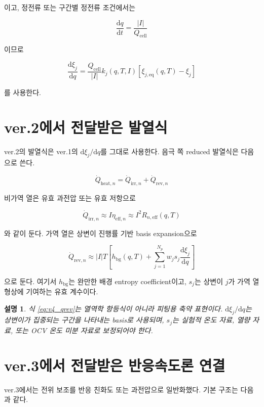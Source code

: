 \documentclass[11pt,a4paper]{article}
\newtheorem*{note}{설명}
\newcommand{\dd}{\mathrm{d}}
\newcommand{\eff}{\mathrm{eff}}
\newcommand{\eq}{\mathrm{eq}}
\begin{document}
이고, 정전류 또는 구간별 정전류 조건에서는

\begin{equation}
\frac{\dd q}{\dd t}=\frac{|I|}{Q_{\mathrm{cell}}}
\label{eq:v4_q_t}
\end{equation}

이므로

\begin{equation}
\frac{\dd\xi_j}{\dd q}=\frac{Q_{\mathrm{cell}}}{|I|}k_j(q,T,I)\left[\xi_{j,\eq}(q,T)-\xi_j\right]
\label{eq:v4_xi_q_basic}
\end{equation}

를 사용한다.

\section{ver.2에서 전달받은 발열식}
ver.2의 발열식은 ver.1의 \(\dd\xi_j/\dd q\)를 그대로 사용한다. 음극 쪽 reduced 발열식은 다음으로 쓴다.

\begin{equation}
\dot Q_{\mathrm{heat},n}=\dot Q_{\mathrm{irr},n}+\dot Q_{\mathrm{rev},n}
\label{eq:v4_heat_split}
\end{equation}

비가역 열은 유효 과전압 또는 유효 저항으로

\begin{equation}
\dot Q_{\mathrm{irr},n}\approx I\eta_{\eff,n}\approx I^2R_{n,\eff}(q,T)
\label{eq:v4_qirr}
\end{equation}

와 같이 둔다. 가역 열은 상변이 진행률 기반 basis expansion으로

\begin{equation}
\dot Q_{\mathrm{rev},n}\approx |I|T\left[h_{\mathrm{bg}}(q,T)+\sum_{j=1}^{N_p}w_js_j\frac{\dd\xi_j}{\dd q}\right]
\label{eq:v4_qrev}
\end{equation}

으로 둔다. 여기서 \(h_{\mathrm{bg}}\)는 완만한 배경 entropy coefficient이고, \(s_j\)는 상변이 \(j\)가 가역 열 형상에 기여하는 유효 계수이다.

\begin{note}
식 \eqref{eq:v4_qrev}는 열역학 항등식이 아니라 피팅용 축약 표현이다. \(\dd\xi_j/\dd q\)는 상변이가 집중되는 구간을 나타내는 basis로 사용되며, \(s_j\)는 실험적 온도 자료, 열량 자료, 또는 OCV 온도 미분 자료로 보정되어야 한다.
\end{note}

\section{ver.3에서 전달받은 반응속도론 연결}
ver.3에서는 전위 보조를 반응 친화도 또는 과전압으로 일반화했다. 기본 구조는 다음과 같다.
\end{document}
